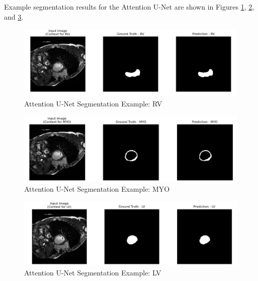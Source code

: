 \documentclass{article}
\begin{document}
Example segmentation results for the Attention U-Net are shown in Figures \ref{fig:attention_unet_example_lv}, \ref{fig:attention_unet_example_myo}, and \ref{fig:attention_unet_example_rv}.
\begin{figure}[H]
  \centering
  \includegraphics[width=\linewidth]{../result/for_ppt/attention_RV.png}
  \caption{Attention U-Net Segmentation Example: RV}
  \label{fig:attention_unet_example_lv}
\end{figure}
\begin{figure}[H]
  \centering
  \includegraphics[width=\linewidth]{../result/for_ppt/attention_MYO.png}
  \caption{Attention U-Net Segmentation Example: MYO}
  \label{fig:attention_unet_example_myo}
\end{figure}
\begin{figure}[H]
  \centering
  \includegraphics[width=\linewidth]{../result/for_ppt/attention_LV.png}
  \caption{Attention U-Net Segmentation Example: LV}
  \label{fig:attention_unet_example_rv}
\end{figure}
\end{document}
